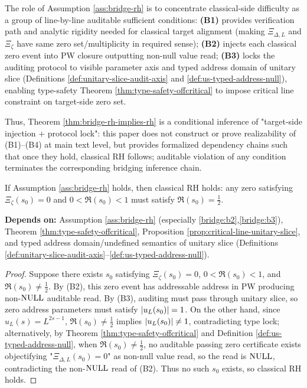 \begin{remark}\label{rem:bridge-rh-strength}
The role of Assumption \ref{ass:bridge-rh} is to concentrate classical-side difficulty as a group of line-by-line auditable sufficient conditions: \textbf{(B1)} provides verification path and analytic rigidity needed for classical target alignment (making $\Xi_{\Delta,L}$ and $\Xi_\zeta$ have same zero set/multiplicity in required sense); \textbf{(B2)} injects each classical zero event into PW closure outputting non-null value read; \textbf{(B3)} locks the auditing protocol to visible parameter axis and typed address domain of unitary slice (Definitions \ref{def:unitary-slice-audit-axis} and \ref{def:us-typed-address-null}), enabling type-safety Theorem \ref{thm:type-safety-offcritical} to impose critical line constraint on target-side zero set.\par
Thus, Theorem \ref{thm:bridge-rh-implies-rh} is a conditional inference of "target-side injection $+$ protocol lock": this paper does not construct or prove realizability of (B1)--(B4) at main text level, but provides formalized dependency chains such that once they hold, classical RH follows; auditable violation of any condition terminates the corresponding bridging inference chain.\par
\end{remark}

\begin{theorem}\label{thm:bridge-rh-implies-rh}
If Assumption \ref{ass:bridge-rh} holds, then classical RH holds: any zero satisfying $\Xi_\zeta(s_0)=0$ and $0<\Re(s_0)<1$ must satisfy $\Re(s_0)=\tfrac12$.\par
\noindent\textnormal{\textbf{Depends on:} Assumption \ref{ass:bridge-rh} (especially \ref{bridge:b2},\ref{bridge:b3}), Theorem \ref{thm:type-safety-offcritical}, Proposition \ref{prop:critical-line-unitary-slice}, and typed address domain/undefined semantics of unitary slice (Definitions \ref{def:unitary-slice-audit-axis}--\ref{def:us-typed-address-null}).}\par
\end{theorem}

\begin{proof}
Suppose there exists $s_0$ satisfying $\Xi_\zeta(s_0)=0$, $0<\Re(s_0)<1$, and $\Re(s_0)\neq \tfrac12$. By (B2), this zero event has addressable address in PW producing non-$\mathrm{NULL}$ auditable read. By (B3), auditing must pass through unitary slice, so zero address parameters must satisfy $\left\lvert u_L(s_0)\right\rvert=1$. On the other hand, since $u_L(s)=L^{2s-1}$, $\Re(s_0)\neq\tfrac12$ implies $\left\lvert u_L(s_0)\right\rvert\neq 1$, contradicting type lock; alternatively, by Theorem \ref{thm:type-safety-offcritical} and Definition \ref{def:us-typed-address-null}, when $\Re(s_0)\neq\tfrac12$, no auditable passing zero certificate exists objectifying "$\Xi_{\Delta,L}(s_0)=0$" as non-null value read, so the read is $\mathrm{NULL}$, contradicting the non-$\mathrm{NULL}$ read of (B2). Thus no such $s_0$ exists, so classical RH holds.\par
\end{proof}

